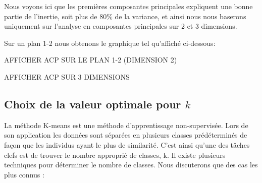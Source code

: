 \documentclass[12pt,a4paper]{book}
\newcommand{\1}{\mathds{1}}
\begin{document}
\noindent
Nous voyons ici que les premières composantes principales expliquent une bonne partie de l'inertie, soit plus de 80\% de la variance, et ainsi nous nous baserons uniquement sur l'analyse en composantes principales sur 2 et 3 dimensions. 

\noindent
Sur un plan 1-2 nous obtenons le graphique tel qu'affiché ci-dessous:

AFFICHER ACP SUR LE PLAN 1-2 (DIMENSION 2)

AFFICHER ACP SUR 3 DIMENSIONS


\subsection{Choix de la valeur optimale pour $k$}


\noindent
La méthode K-means est une méthode d'apprentissage non-supervisée. Lors de son application les données sont séparées en plusieurs classes prédéterminés de façon que les individus ayant le plus de similarité. C’est ainsi qu’une des tâches clefs est de trouver le nombre approprié de classes, k. Il existe plusieurs techniques pour déterminer le nombre de classes. Nous discuterons que des cas les plus connus : 
\end{document}
